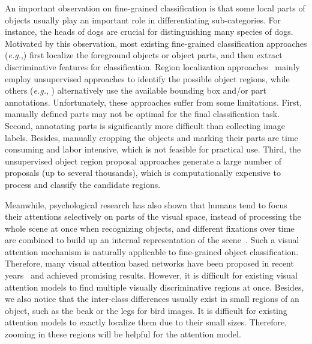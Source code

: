 \documentclass[journal]{IEEEtran}
\begin{document}
An important observation on fine-grained classification is that some local parts of objects usually play an important role in differentiating sub-categories. For instance, the heads of dogs are crucial for distinguishing many species of dogs. Motivated by this observation, most existing fine-grained classification approaches (\textit{e.g.},\cite{poof, kernal, pose_normalized, symbiotic_segmentation, codebook_free, part-based-rcnn, two_level_attention, fully_convolutional_attention}) first localize the foreground objects or object parts, and then extract discriminative features for classification. Region localization approaches~\cite{two_level_attention, fully_convolutional_attention} mainly employ unsupervised approaches to identify the possible object regions, while others (\textit{e.g.}, \cite{poof, kernal,pose_normalized, symbiotic_segmentation, codebook_free, part-based-rcnn}) alternatively use the available bounding box and/or part annotations. Unfortunately, these approaches suffer from some limitations. First, manually defined parts may not be optimal for the final classification task. Second, annotating parts is significantly more difficult than collecting image labels. Besides, manually cropping the objects and marking their parts are time consuming and labor intensive, which is not feasible for practical use. Third, the unsupervised object region proposal approaches generate a large number of proposals (up to several thousands), which is computationally expensive to process and classify the candidate regions.

Meanwhile, psychological research has also shown that humans tend to focus their attentions selectively on parts of the visual space, instead of processing the whole scene at once when recognizing objects, and different fixations over time are combined to build up an internal representation of the scene~\cite{ronald_2000, tmm01}. Such a visual attention mechanism is naturally applicable to fine-grained object classification. Therefore, many visual attention based networks have been proposed in recent years~\cite{action_recognition, attention_categorization, fully_convolutional_attention, multiple-object_visual-attention, two_level_attention, Xu:2015ut, Jaderberg:2015vo} and achieved promising results. However, it is difficult for existing visual attention models to find multiple visually discriminative regions at once. Besides, we also notice that the inter-class differences usually exist in small regions of an object, such as the beak or the legs for bird images. It is difficult for existing attention models to exactly localize them due to their small sizes. Therefore, zooming in these regions will be helpful for the attention model.
\end{document}
